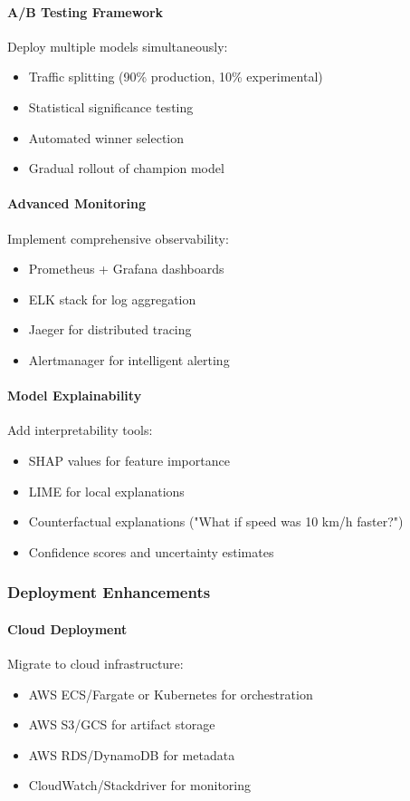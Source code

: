 \paragraph{A/B Testing Framework}
Deploy multiple models simultaneously:
\begin{itemize}
    \item Traffic splitting (90\% production, 10\% experimental)
    \item Statistical significance testing
    \item Automated winner selection
    \item Gradual rollout of champion model
\end{itemize}

\paragraph{Advanced Monitoring}
Implement comprehensive observability:
\begin{itemize}
    \item Prometheus + Grafana dashboards
    \item ELK stack for log aggregation
    \item Jaeger for distributed tracing
    \item Alertmanager for intelligent alerting
\end{itemize}

\paragraph{Model Explainability}
Add interpretability tools:
\begin{itemize}
    \item SHAP values for feature importance
    \item LIME for local explanations
    \item Counterfactual explanations ("What if speed was 10 km/h faster?")
    \item Confidence scores and uncertainty estimates
\end{itemize}

\subsubsection{Deployment Enhancements}

\paragraph{Cloud Deployment}
Migrate to cloud infrastructure:
\begin{itemize}
    \item AWS ECS/Fargate or Kubernetes for orchestration
    \item AWS S3/GCS for artifact storage
    \item AWS RDS/DynamoDB for metadata
    \item CloudWatch/Stackdriver for monitoring
\end{itemize}

